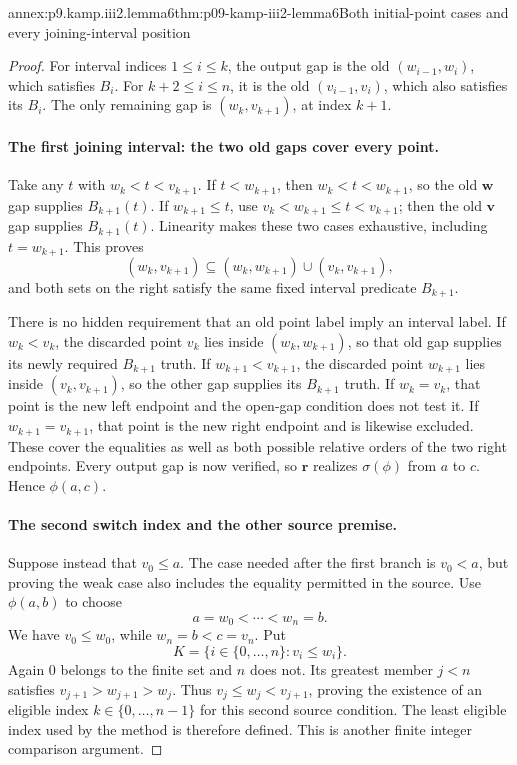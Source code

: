 \begin{annexitem}{annex:p9.kamp.iii2.lemma6}{thm:p09-kamp-iii2-lemma6}{Both initial-point cases and every joining-interval position}
\begin{proof}
For interval indices \(1\leq i\leq k\), the output gap is the
old \((w_{i-1},w_i)\), which satisfies \(B_i\).
For \(k+2\leq i\leq n\), it is the old
\((v_{i-1},v_i)\), which also satisfies its \(B_i\).
The only remaining gap is \((w_k,v_{k+1})\), at index \(k+1\).

\paragraph{The first joining interval: the two old gaps cover every point.}
Take any \(t\) with \(w_k<t<v_{k+1}\).
If \(t<w_{k+1}\), then
\(w_k<t<w_{k+1}\), so the old \(\mathbf w\) gap supplies
\(B_{k+1}(t)\). If \(w_{k+1}\leq t\), use
\(v_k<w_{k+1}\leq t<v_{k+1}\); then the old \(\mathbf v\)
gap supplies \(B_{k+1}(t)\).
Linearity makes these two cases exhaustive, including
\(t=w_{k+1}\). This proves
\[
 (w_k,v_{k+1})\subseteq
                  (w_k,w_{k+1})\cup(v_k,v_{k+1}),
\]
and both sets on the right satisfy the same fixed interval predicate
\(B_{k+1}\).

There is no hidden requirement that an old point label imply an
interval label. If \(w_k<v_k\), the discarded point \(v_k\)
lies inside \((w_k,w_{k+1})\), so that old gap supplies its
newly required \(B_{k+1}\) truth. If
\(w_{k+1}<v_{k+1}\), the discarded point \(w_{k+1}\)
lies inside \((v_k,v_{k+1})\), so the other gap supplies its
\(B_{k+1}\) truth. If \(w_k=v_k\), that point is the new
left endpoint and the open-gap condition does not test it.
If \(w_{k+1}=v_{k+1}\), that point is the new right endpoint
and is likewise excluded. These cover the equalities as well as both
possible relative orders of the two right endpoints.
Every output gap is now verified, so \(\mathbf r\) realizes
\(\sigma(\phi)\) from \(a\) to \(c\). Hence \(\phi(a,c)\).

\paragraph{The second switch index and the other source premise.}
Suppose instead that \(v_0\leq a\). The case needed after the
first branch is \(v_0<a\), but proving the weak case also includes
the equality permitted in the source. Use \(\phi(a,b)\) to choose
\[
                           a=w_0<\cdots<w_n=b.
\]
We have \(v_0\leq w_0\), while \(w_n=b<c=v_n\).
Put
\[
                    K=\{i\in\{0,\ldots,n\}:v_i\leq w_i\}.
\]
Again 0 belongs to the finite set and \(n\) does not. Its greatest
member \(j<n\) satisfies \(v_{j+1}>w_{j+1}>w_j\).
Thus
\(v_j\leq w_j<v_{j+1}\), proving the existence of an eligible
index \(k\in\{0,\ldots,n-1\}\) for this second source condition.
The least eligible index used by the method is therefore defined.
This is another finite integer comparison argument.


\end{proof}
\end{annexitem}

